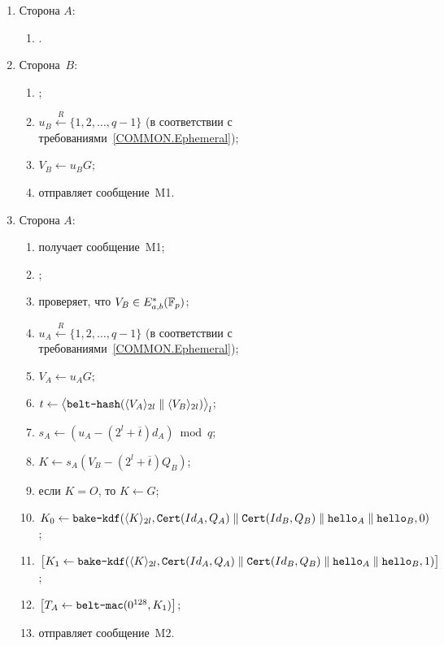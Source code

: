 \begin{enumerate}
\item
Сторона $A$:
\begin{enumerate}
\item
{}.
\end{enumerate}

\item
Сторона~$B$:
\begin{enumerate}
\item
{};
\item
$u_B\stackrel{R}{\leftarrow}\{1,2,\ldots,q-1\}$
(в соответствии с требованиями~\ref{COMMON.Ephemeral});
\item
$V_B\leftarrow u_B G$;
\item
отправляет сообщение~M1.
\end{enumerate}
\item
Сторона $A$:
\begin{enumerate}
\item
получает сообщение~M1;
\item
{};
\item
проверяет, что $V_B\in E_{a,b}^*(\mathbb{F}_p)$;
\item
$u_A\stackrel{R}{\leftarrow}\{1,2,\ldots,q-1\}$
(в соответствии с требованиями~\ref{COMMON.Ephemeral});
\item
$V_A\leftarrow u_A G$;
\item
$t\leftarrow\bigl\langle
\texttt{belt-hash}
(\langle V_A\rangle_{2l}\parallel\langle V_B\rangle_{2l})
\bigr\rangle_{l}$;
\item
$s_A\leftarrow (u_A-(2^l+\overline{t})d_A)\bmod q$;
\item
$K\leftarrow s_A(V_B-(2^l+\overline{t})Q_B)$;
\item
если $K=O$, то $K\leftarrow G$;
\item
$K_0\leftarrow\texttt{bake-kdf}
(\langle K\rangle_{2l},
\texttt{Cert}(Id_A,Q_A)\parallel \texttt{Cert}(Id_B,Q_B)\parallel 
\texttt{hello}_A\parallel\texttt{hello}_B,
0)$;
\item
$\mathbf{\bigl[}
K_1\leftarrow\texttt{bake-kdf}
(\langle K\rangle_{2l},
\texttt{Cert}(Id_A,Q_A)\parallel \texttt{Cert}(Id_B,Q_B)\parallel 
\texttt{hello}_A\parallel\texttt{hello}_B,
1)\mathbf{\bigr]}$;
\item
$\mathbf{\bigl[}T_A\leftarrow\texttt{belt-mac}(0^{128},K_1)\mathbf{\bigr]}$;
\item
отправляет сообщение~M2.
\end{enumerate}


\end{enumerate}
